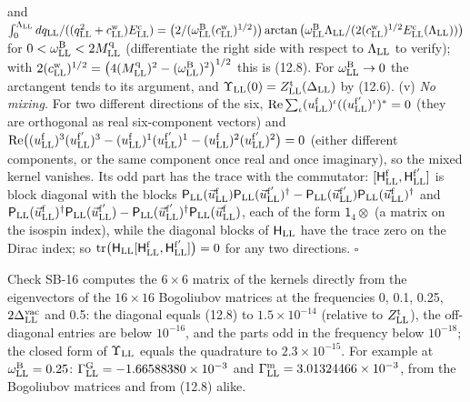 \documentclass[
  10pt,
]{article}
\begin{document}
and
\(\int_0^{\Lambda_{\rm LL}}dq_{\rm LL}/((q_{\rm LL}^2+c^{\rm w}_{\rm LL})E^{\rm c}_{\rm LL})=\big(2/(\omega^{\rm B}_{\rm LL}(c^{\rm w}_{\rm LL})^{1/2})\big)\arctan\big(\omega^{\rm B}_{\rm LL}\Lambda_{\rm LL}/(2(c^{\rm w}_{\rm LL})^{1/2}E^{\rm c}_{\rm LL}(\Lambda_{\rm LL}))\big)\)
for \(0<\omega^{\rm B}_{\rm LL}<2M^{\rm q}_{\rm LL}\) (differentiate the
right side with respect to \(\Lambda_{\rm LL}\) to verify); with
\(2(c^{\rm w}_{\rm LL})^{1/2}=\big(4(M^{\rm q}_{\rm LL})^2-(\omega^{\rm B}_{\rm LL})^2\big)^{1/2}\)
this is (12.8). For \(\omega^{\rm B}_{\rm LL}\to0\) the arctangent tends
to its argument, and
\(\Upsilon_{\rm LL}(0)=Z^{\rm t}_{\rm LL}(\Delta_{\rm LL})\) by (12.6).
(v) \emph{No mixing.} For two different directions of the six,
\({\rm Re}\sum_\iota(u^{\rm f}_{\rm LL})^\iota((u^{\rm f'}_{\rm LL})^\iota)^*=0\)
(they are orthogonal as real six-component vectors) and
\({\rm Re}\big((u^{\rm f}_{\rm LL})^3(u^{\rm f'}_{\rm LL})^3-(u^{\rm f}_{\rm LL})^1(u^{\rm f'}_{\rm LL})^1-(u^{\rm f}_{\rm LL})^2(u^{\rm f'}_{\rm LL})^2\big)=0\)
(either different components, or the same component once real and once
imaginary), so the mixed kernel vanishes. Its odd part has the trace
with the commutator:
\([\mathsf H^{\rm f}_{\rm LL},\mathsf H^{\rm f'}_{\rm LL}]\) is block
diagonal with the blocks
\(\mathsf P_{\rm LL}(\vec u^{\rm f}_{\rm LL})\mathsf P_{\rm LL}(\vec u^{\rm f'}_{\rm LL})^\dagger-\mathsf P_{\rm LL}(\vec u^{\rm f'}_{\rm LL})\mathsf P_{\rm LL}(\vec u^{\rm f}_{\rm LL})^\dagger\)
and
\(\mathsf P_{\rm LL}(\vec u^{\rm f}_{\rm LL})^\dagger\mathsf P_{\rm LL}(\vec u^{\rm f'}_{\rm LL})-\mathsf P_{\rm LL}(\vec u^{\rm f'}_{\rm LL})^\dagger\mathsf P_{\rm LL}(\vec u^{\rm f}_{\rm LL})\),
each of the form \(\mathsf 1_4\otimes\) (a matrix on the isospin index),
while the diagonal blocks of \(\mathsf H_{\rm LL}\) have the trace zero
on the Dirac index; so
\({\rm tr}\big(\mathsf H_{\rm LL}[\mathsf H^{\rm f}_{\rm LL},\mathsf H^{\rm f'}_{\rm LL}]\big)=0\)
for any two directions. \(\square\)

Check SB-16 computes the \(6\times6\) matrix of the kernels directly
from the eigenvectors of the \(16\times16\) Bogoliubov matrices at the
frequencies 0, 0.1, 0.25, \(2\Delta^{\rm vac}_{\rm LL}\) and 0.5: the
diagonal equals (12.8) to \(1.5\times10^{-14}\) (relative to
\(Z^{\rm t}_{\rm LL}\)), the off-diagonal entries are below
\(10^{-16}\), and the parts odd in the frequency below \(10^{-18}\); the
closed form of \(\Upsilon_{\rm LL}\) equals the quadrature to
\(2.3\times10^{-15}\). For example at \(\omega^{\rm B}_{\rm LL}=0.25\):
\(\Gamma^{\rm G}_{\rm LL}=-1.66588380\times10^{-3}\) and
\(\Gamma^{\rm m}_{\rm LL}=3.01324466\times10^{-3}\), from the Bogoliubov
matrices and from (12.8) alike.
\end{document}
